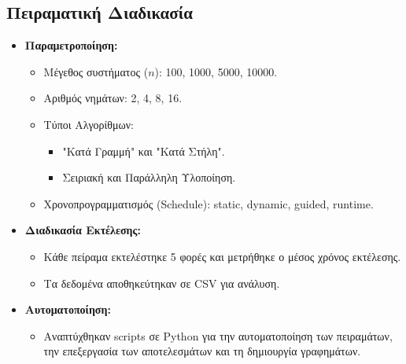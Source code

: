\documentclass{article}
\begin{document}
\subsection*{Πειραματική Διαδικασία} 
\begin{itemize} 
    \item \textbf{Παραμετροποίηση:} 
    \begin{itemize} 
        \item Μέγεθος συστήματος ($n$): 100, 1000, 5000, 10000. 
        \item Αριθμός νημάτων: 2, 4, 8, 16. \item Τύποι Αλγορίθμων: 
        \begin{itemize} \item "Κατά Γραμμή" και "Κατά Στήλη". 
            \item Σειριακή και Παράλληλη Υλοποίηση. 
        \end{itemize} 
        \item Χρονοπρογραμματισμός (Schedule): static, dynamic, guided, runtime. 
    \end{itemize} 
    \item \textbf{Διαδικασία Εκτέλεσης:} 
    \begin{itemize} 
        \item Κάθε πείραμα εκτελέστηκε 5 φορές και μετρήθηκε ο μέσος χρόνος εκτέλεσης. 
        \item Τα δεδομένα αποθηκεύτηκαν σε CSV για ανάλυση. 
    \end{itemize} 
    \item \textbf{Αυτοματοποίηση:} 
    \begin{itemize} 
        \item Αναπτύχθηκαν scripts σε Python για την αυτοματοποίηση των πειραμάτων, την επεξεργασία των αποτελεσμάτων και τη δημιουργία γραφημάτων. 
    \end{itemize} 
\end{itemize}
\end{document}
